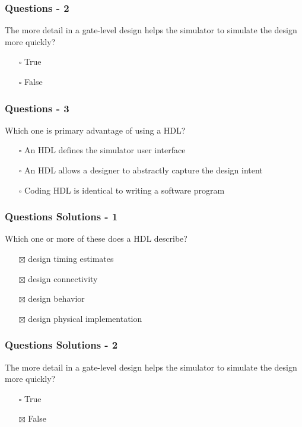 \documentclass[t]{beamer}
\begin{document}
\begin{frame}
\frametitle{Questions - 2}

The more detail in a gate-level design helps the simulator to simulate the design more quickly?

\begin{itemize}
\item[$\square$] True
\item[$\square$] False
\end{itemize}
\end{frame}

\begin{frame}
\frametitle{Questions - 3}

Which one is primary advantage of using a HDL?

\begin{itemize}
\item[$\square$] An HDL defines the simulator user interface
\item[$\square$] An HDL allows a designer to abstractly capture the design intent
\item[$\square$] Coding HDL is identical to writing a software program
\end{itemize}
\end{frame}

\begin{frame}
\frametitle{Questions Solutions - 1}

Which one or more of these does a HDL describe?

\begin{itemize}
\item[$\boxtimes$] design timing estimates
\item[$\boxtimes$] design connectivity
\item[$\boxtimes$] design behavior
\item[$\boxtimes$] design physical implementation
\end{itemize}
\end{frame}

\begin{frame}
\frametitle{Questions Solutions - 2}

The more detail in a gate-level design helps the simulator to simulate the design more quickly?

\begin{itemize}
\item[$\square$] True
\item[$\boxtimes$] False
\end{itemize}
\end{frame}
\end{document}
